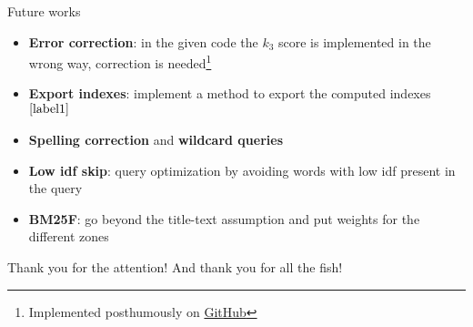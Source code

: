 \documentclass[]{beamer}
\begin{document}
\appendix
\begin{frame}{Future works}
    \begin{itemize}
        \item \textbf{Error correction}: in the given code the $k_3$ score is implemented in the wrong way,
        correction is needed\footnote{\label{label1}Implemented posthumously on \href{https://github.com/abarbieri98/Information-Retrieval---Final-Project}{GitHub}}
        \item \textbf{Export indexes}: implement a method to export the computed indexes$^{\ref{label1}}$
        \item \textbf{Spelling correction} and \textbf{wildcard queries}
        \item \textbf{Low idf skip}: query optimization by avoiding words with low idf present in the query
        \item \textbf{BM25F}: go beyond the title-text assumption and put weights for the different zones
    \end{itemize}
\end{frame}
\begin{frame}
    \centering
    \huge{Thank you for the attention!}
    \vfill
    \small{And thank you for all the fish!}
\end{frame}
\end{document}
